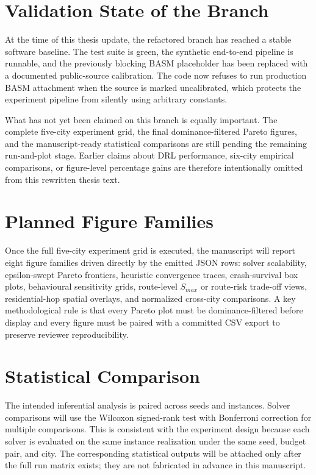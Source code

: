 \section{Validation State of the Branch}

At the time of this thesis update, the refactored branch has reached a stable software baseline. The test suite is green, the synthetic end-to-end pipeline is runnable, and the previously blocking BASM placeholder has been replaced with a documented public-source calibration. The code now refuses to run production BASM attachment when the source is marked uncalibrated, which protects the experiment pipeline from silently using arbitrary constants.

What has not yet been claimed on this branch is equally important. The complete five-city experiment grid, the final dominance-filtered Pareto figures, and the manuscript-ready statistical comparisons are still pending the remaining run-and-plot stage. Earlier claims about DRL performance, six-city empirical comparisons, or figure-level percentage gains are therefore intentionally omitted from this rewritten thesis text.

\section{Planned Figure Families}

Once the full five-city experiment grid is executed, the manuscript will report eight figure families driven directly by the emitted JSON rows: solver scalability, epsilon-swept Pareto frontiers, heuristic convergence traces, crash-survival box plots, behavioural sensitivity grids, route-level $S_{max}$ or route-risk trade-off views, residential-hop spatial overlays, and normalized cross-city comparisons. A key methodological rule is that every Pareto plot must be dominance-filtered before display and every figure must be paired with a committed CSV export to preserve reviewer reproducibility.

\section{Statistical Comparison}

The intended inferential analysis is paired across seeds and instances. Solver comparisons will use the Wilcoxon signed-rank test with Bonferroni correction for multiple comparisons. This is consistent with the experiment design because each solver is evaluated on the same instance realization under the same seed, budget pair, and city. The corresponding statistical outputs will be attached only after the full run matrix exists; they are not fabricated in advance in this manuscript.
